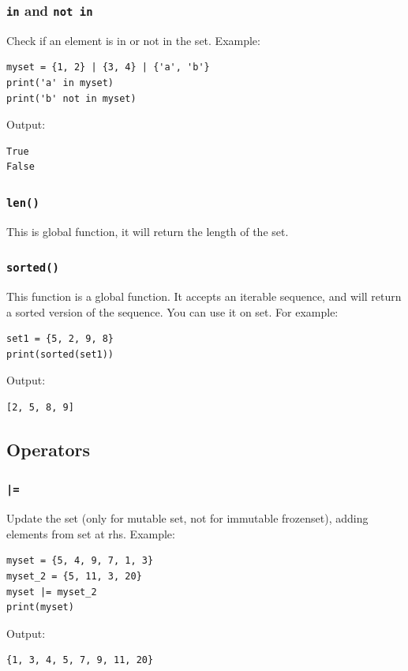 \documentclass[12pt]{book}
\begin{document}
\subsubsection{\texttt{in} and \texttt{not in}}
\label{sec:org7b832c0}
Check if an element is in or not in the set. Example:
\begin{verbatim}
myset = {1, 2} | {3, 4} | {'a', 'b'}
print('a' in myset)
print('b' not in myset)
\end{verbatim}
Output:
\begin{verbatim}
True
False
\end{verbatim}
\subsubsection{\texttt{len()}}
\label{sec:org0f195a9}
This is global function, it will return the length of the set.
\subsubsection{\texttt{sorted()}}
\label{sec:org589f6d9}
This function is a global function. It accepts an iterable sequence, and will return a sorted version of the sequence. You can use it on set. For example:
\begin{verbatim}
set1 = {5, 2, 9, 8}
print(sorted(set1))
\end{verbatim}
Output:
\begin{verbatim}
[2, 5, 8, 9]
\end{verbatim}
\subsection{Operators}
\label{sec:org7055bf1}
\subsubsection{\texttt{|=}}
\label{sec:org2078f1f}
Update the set (only for mutable set, not for immutable frozenset), adding elements from set at rhs. Example:
\begin{verbatim}
myset = {5, 4, 9, 7, 1, 3}
myset_2 = {5, 11, 3, 20}
myset |= myset_2
print(myset)
\end{verbatim}
Output:
\begin{verbatim}
{1, 3, 4, 5, 7, 9, 11, 20}
\end{verbatim}
\end{document}

